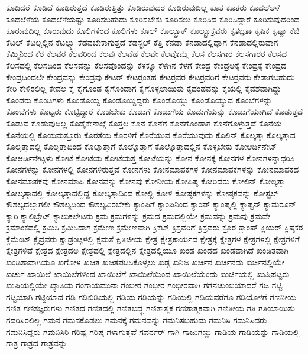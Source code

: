 {ಕೂಡಿದರೆ
ಕೂಡಿದೆ
ಕೂಡಿರುತ್ತದೆ
ಕೂಡಿರುತ್ತಿತ್ತು
ಕೂಡಿರುವುದರ
ಕೂಡಿರುವುದಿಲ್ಲ
ಕೂತ
ಕೂತರು
ಕೂದಲೆಅಳೆ
ಕೂದಲೆಳೆಯ
ಕೂದಲೆಳೆಯಷ್ಟು
ಕೂರಿಸಬಹುದು
ಕೂರಿಸಬೇಕು
ಕೂರಿಸಲು
ಕೂರಿಸಿದ
ಕೂರಿಸಿದ್ದಾರೆ
ಕೂರಿಸುವುದರಿಂದ
ಕೂರುವುದಿಲ್ಲ
ಕೂರುವುದು
ಕೂಲಿಗಳಿಂದ
ಕೂಲಿಗಳು
ಕೂಲ್
ಕೂಲ್ಬ್ರೂಕ್
ಕೂಲ್ಬ್ರೂಕ್ರವರು
ಕೃತಜ್ಞತಾ
ಕೃಷಿಕ
ಕೃಷ್ಣಾ
ಕೆಜಿ
ಕೆಟಲ್
ಕೆಟಲ್ನಲ್ಲಿನ
ಕೆಟಲ್ನ್ನು
ಕೆಡವಬೇಕಾಗುತ್ತದೆ
ಕೆಡಸ್ಟ್ರಲ್
ಕೆತ್ತಿ
ಕೆನಡಾ
ಕೆನಡಾದಲ್ಲಿದ್ದಾಗ
ಕೆನಡಾದಲ್ಲಿರುವಾಗ
ಕೆಮ್ಮಿನಿಂದ
ಕೆರೆ
ಕೆಲವರ
ಕೆಲವರಿಂದ
ಕೆಲವು
ಕೆಲವೆಡೆ
ಕೆಲವೇ
ಕೆಲವೊಮ್ಮೆ
ಕೆಲಸ
ಕೆಲಸಗಾರ
ಕೆಲಸಗಾರರ
ಕೆಲಸದ
ಕೆಲಸದಲ್ಲಿ
ಕೆಲಸದಿಂದ
ಕೆಲಸವನ್ನು
ಕೆಲಸವೊಂದನ್ನು
ಕೆಳಕ್ಕೂ
ಕೆಳಗಿನ
ಕೆಳಗೆ
ಕೇಂದ್ರ
ಕೇಂದ್ರಅಕ್ಕೆ
ಕೇಂದ್ರಕ್ಕೆ
ಕೇಂದ್ರದ
ಕೇಂದ್ರದಿಂದಲೇ
ಕೇಂದ್ರವನ್ನು
ಕೇಂದ್ರವು
ಕೇಟರ್
ಕೇಟರ್ರಂತಹ
ಕೇಟರ್ರವರ
ಕೇಟರ್ರವರಿಗೆ
ಕೇಟರ್ರವರು
ಕೇಡಾಗಬಹುದು
ಕೇರಿ
ಕೇಳಿರಲಿಲ್ಲ
ಕೇವಲ
ಕೈ
ಕೈಗೊಂಡ
ಕೈಗೊಂಡಾಗ
ಕೈಗೊಳ್ಳಲಾಯಿತು
ಕೈದಂಡವನ್ನು
ಕೈಯಲ್ಲಿ
ಕೈವಶವಾಗಿದ್ದು
ಕೊಂಡರು
ಕೊಂಡಿಗಳು
ಕೊಂಡೊಯ್ದ
ಕೊಂಡೊಯ್ದಿದ್ದರು
ಕೊಂಡೊಯ್ದು
ಕೊಂಡೊಯ್ಯುವ
ಕೊಂಬೆಗಳನ್ನು
ಕೊಂಬೆಗಳು
ಕೊಟ್ಟರು
ಕೊಟ್ಟಿದ್ದಾರೆ
ಕೊಡಬೇಕು
ಕೊಡುಗೆ
ಕೊಡುಗೆಯ
ಕೊಡುಗೆಯನ್ನು
ಕೊಡುಗೆಯಾಗಿದೆ
ಕೊಡುತ್ತದೆ
ಕೊಡುವ
ಕೊಡುವುದಿಲ್ಲ
ಕೊಡೈಕೇನಾಲ್ಗೆ
ಕೊತ್ತಲ
ಕೊನೆ
ಕೊನೆಗೆ
ಕೊನೆಗೊಂಡಾಗ
ಕೊನೆಗೊಳ್ಳುತ್ತದೆ
ಕೊನೆಯ
ಕೊನೆಯಲ್ಲಿ
ಕೊಯಮತ್ತೂರು
ಕೊರತೆಯ
ಕೊರಳಿಗೆ
ಕೊರೆಯುವ
ಕೊರೆಯುವುದು
ಕೊಲಿನ್
ಕೊಲ್ಕತ್ತಾ
ಕೊಲ್ಕತ್ತಾದ
ಕೊಲ್ಕತ್ತಾದಲ್ಲಿ
ಕೊಲ್ಕತ್ತಾದಿಂದ
ಕೊಲ್ಕಾತ್ತಾಗೆ
ಕೊಲ್ಕೊತ್ತಾಗೆ
ಕೊಲ್ಕೊತ್ತಾದಲ್ಲಿನ
ಕೊಳ್ಳಬೇಕು
ಕೋಆರ್ಡಿನೇಟ್
ಕೋಆರ್ಡಿನೇಟ್ಗಳು
ಕೋಟೆ
ಕೋಟೆಯ
ಕೋಟೆಯತ್ತ
ಕೋಟೆಯನ್ನು
ಕೋನ
ಕೋನಕ್ಕೆ
ಕೋನಗಳ
ಕೋನಗಳನ್ನಾಧರಿಸಿ
ಕೋನಗಳನ್ನು
ಕೋನಗಳಲ್ಲಿ
ಕೋನಗಳಿರುತ್ತವೆ
ಕೋನಗಳು
ಕೋನಮಾಪಕಗಳ
ಕೋನಮಾಪಕಗಳನ್ನು
ಕೋನಮಾಪಕದ
ಕೋನಮಾಪಕವು
ಕೋನಮಾಪಿ
ಕೋನವನ್ನು
ಕೋನವು
ಕೋನೀಯ
ಕೋಪಿಷ್ಠ
ಕೋರಿದರು
ಕೋಲಿನ್
ಕೋಲ್ಕತ್ತಾ
ಕೋಲ್ಕತ್ತಾದಲ್ಲಿ
ಕೋಲ್ಕತ್ತಾದಲ್ಲಿದ್ದ
ಕೋಲ್ಕತ್ತಾದಿಂದ
ಕೋಲ್ಬಿ
ಕೋಳಿ
ಕೋಷ್ಠಕಗಳನ್ನು
ಕೋಷ್ಠಕವನ್ನು
ಕೋಸ್ಟಲ್
ಕೌಶಲ್ಯದಲ್ಲಾಗಲೀ
ಕೌಶಲ್ಯದಿಂದ
ಕೌಶಲ್ಯವಿರಬೇಕು
ಕ್ಯಾಂಪಿಗೆ
ಕ್ಯಾಂಪಿನಿಂದ
ಕ್ಯಾಂಪ್
ಕ್ಯಾಂಪ್ನಲ್ಲಿ
ಕ್ಯಾಪ್ಟನ್
ಕ್ಯಾಮರೂನ್
ಕ್ಯಾರಿ
ಕ್ಯಾಲಿಬ್ರೇಟ್
ಕ್ಯಾಲುಕಲೇಟರು
ಕ್ರಮ
ಕ್ರಮಗಳನ್ನು
ಕ್ರಮದ
ಕ್ರಮದಲ್ಲಿಯೇ
ಕ್ರಮವನ್ನು
ಕ್ರಮವು
ಕ್ರಮವೇ
ಕ್ರಮಾಂಕದಲ್ಲಿ
ಕ್ರಮಿಸಿ
ಕ್ರಮಿಸಿದಾಗ
ಕ್ರಮೇಣ
ಕ್ರಮೇಣವಾಗಿ
ಕ್ರಿಕೆಟ್
ಕ್ರಿಸ್ರವರಿಗೆ
ಕ್ರಿಸ್ರವರು
ಕ್ರೂರ
ಕ್ಲಾಂಪ್
ಕ್ಲಿಯರ್
ಕ್ಲಿಷ್ಠಕರ
ಕ್ಲೆಮೆಂಟ್
ಕ್ಲೈವ್ರವರು
ಕ್ವಾಡ್ರಂಟ್ಗಳಲ್ಲಿ
ಕ್ಷಮತೆ
ಕ್ಷಿತಿಜೀಯ
ಕ್ಷೇತ್ರ
ಕ್ಷೇತ್ರಕಾರ್ಯದ
ಕ್ಷೇತ್ರಕ್ಕೆ
ಕ್ಷೇತ್ರಗಳ
ಕ್ಷೇತ್ರಗಳಲ್ಲಿ
ಕ್ಷೇತ್ರಗಳಿಗೆ
ಕ್ಷೇತ್ರಗಳಿವೆ
ಕ್ಷೇತ್ರದ
ಕ್ಷೇತ್ರದಅ
ಕ್ಷೇತ್ರದಲ್ಲಿ
ಕ್ಷೇತ್ರದಲ್ಲಿನ
ಕ್ಷೇತ್ರದಲ್ಲಿಯೂ
ಖಂಡ
ಖಂಡದ
ಖಂಡವಾಗಿದೆ
ಖಂಡಿತವಾಗಿ
ಖಂಡಿತಾವಾಗಿಯೂ
ಖಗೋಳ
ಖಚಿತ
ಖಚಿತಪಡಿಸಿಕೊಳ್ಳಲು
ಖಡ್ಗ
ಖನಿಜ
ಖರ್ಚಿನ
ಖರ್ಚಿನದು
ಖರ್ಚಿನಲ್ಲಿಯೇ
ಖರ್ಚು
ಖಾಯಿಲೆ
ಖಾಯಿಲೆಗಳಿಂದ
ಖಾಯಿಲೆಗೆ
ಖಾಯಿಲೆಯಿಂದ
ಖಾಯಿಲೆಯೆಂದು
ಖುರ್ಚಿಯಲ್ಲಿ
ಖುಷಿಪಟ್ಟರು
ಖುಷಿಯಲ್ಲಿಯೇ
ಖ್ಯಾತಿಯ
ಗಂಗಾಯಮುನಾ
ಗಂಬೀರ
ಗಂಭೀರ
ಗಂಭೀರವಾಗಿ
ಗಗನಚುಂಬಿಯಾದರೆ
ಗಜ
ಗಟ್ಟಿ
ಗಟ್ಟಿಯಾಗಿ
ಗಟ್ಟಿಯಾದ
ಗಡಿ
ಗಡಿಬಿಡಿಯಲ್ಲಿ
ಗಡಿಯ
ಗಡಿಯನ್ನು
ಗಡಿಯಲ್ಲಿ
ಗಡಿಯವರೆಗೂ
ಗಡಿಯೊಳಗೆ
ಗಣನೀಯ
ಗಣಿತ
ಗಣಿತಜ್ಞರುಗಳು
ಗಣಿತದ
ಗಣಿತದಲ್ಲಿ
ಗಣಿತಬದ್ಧ
ಗಣಿತಾತ್ಮಕ
ಗಣಿತಾತ್ಮಕವಾಗಿ
ಗಣಿತೀಯ
ಗತಿ
ಗತಿಯಾಯಿತು
ಗದರಿಸಿರಲಿಲ್ಲ
ಗಮನ
ಗಮನಕೊಡಲು
ಗಮನಕ್ಕೆ
ಗಮನವನ್ನು
ಗಮನಿಸಬಹುದು
ಗಮನಿಸಿ
ಗಮನಿಸಿದರು
ಗಮನಿಸಿದ್ದರು
ಗಮನಿಸಿರಿ
ಗರಿಷ್ಟ
ಗರಿಷ್ಠ
ಗಳಾಗುತ್ತವೆ
ಗವರ್ನರ್
ಗಾಗಿ
ಗಾಜುಗಣ್ಣು
ಗಾಡಿಯ
ಗಾಡಿಯನ್ನು
ಗಾಡಿಯಲ್ಲಿ
ಗಾತ್ರ
ಗಾತ್ರದ
ಗಾತ್ರವನ್ನು
}
